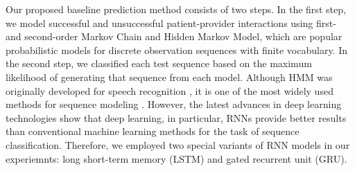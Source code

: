 \documentclass{amia_summit_2018}
\begin{document}
Our proposed baseline prediction method consists of two steps. In the first step, we model successful and unsuccessful patient-provider interactions using first- and second-order Markov Chain and Hidden Markov Model, which are popular probabilistic models for discrete observation sequences with finite vocabulary. In the second step, we classified each test sequence based on the maximum likelihood of generating that sequence from each model. Although HMM was originally developed for speech recognition \cite{rabiner1989tutorial}, it is one of the most widely used methods for sequence modeling \cite{mutsam2016maximum, won2004training, chai2001folk}. However, the latest advances in deep learning technologies show that deep learning, in particular, RNNs provide better results than conventional machine learning methods for the task of sequence classification. Therefore, we employed two special variants of RNN models in our experiemnts: long short-term memory (LSTM) and gated recurrent unit (GRU).
\end{document}
